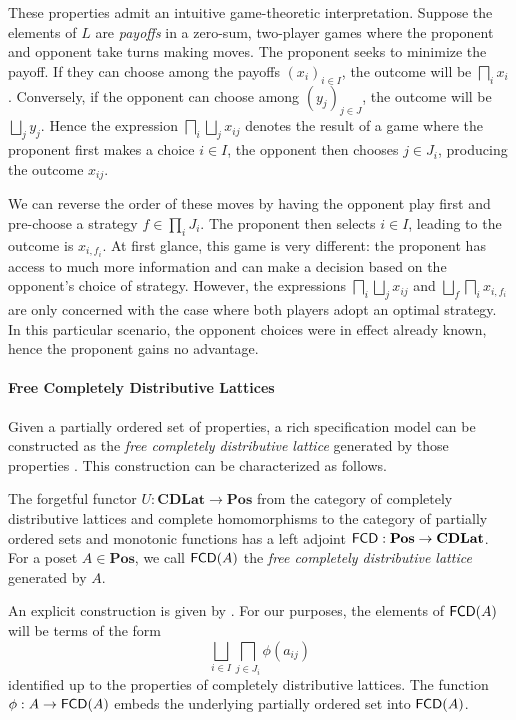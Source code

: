 \documentclass[acmsmall,review,anonymous]{acmart}\settopmatter{printfolios=true,printccs=false,printacmref=false}
\begin{document}
These properties admit an intuitive game-theoretic interpretation.
Suppose the elements of $L$
are \emph{payoffs} in a zero-sum, two-player games
where the proponent and opponent
take turns making moves.
The proponent seeks to minimize the payoff.
If they can choose among the payoffs $(x_i)_{i \in I}$,
the outcome will be $\bigsqcap_i x_i$.
Conversely,
if the opponent can choose among $(y_j)_{j \in J}$,
the outcome will be $\bigsqcup_j y_j$.
Hence the expression
$\bigsqcap_i \bigsqcup_j x_{ij}$
denotes the result of a game where
the proponent first makes a choice $i \in I$,
the opponent then chooses $j \in J_i$,
producing the outcome $x_{ij}$.

We can reverse the order of these moves
by having the opponent play first
and pre-choose a strategy $f \in \prod_i J_i$.
The proponent then selects $i \in I$,
leading to the outcome is $x_{i,f_i}$.
At first glance,
this game is very different:
the proponent has access to much more information
and can make a decision based on the opponent's choice of strategy.
However,
the expressions $\bigsqcap_i \bigsqcup_j x_{ij}$
and $\bigsqcup_f \bigsqcap_i x_{i,f_i}$
are only concerned with the case where both players adopt
an optimal strategy.
In this particular scenario,
the opponent choices were in effect already known,
hence the proponent gains no advantage.

\paragraph{Free Completely Distributive Lattices}

Given a partially ordered set of properties,
a rich specification model can be constructed as
the \emph{free completely distributive lattice}
generated by those properties \cite{augtyp,dndf}.
This construction can be characterized as follows.

\begin{definition}
The forgetful functor
$U : \mathbf{CDLat} \rightarrow \mathbf{Pos}$
from the category of completely distributive lattices
and complete homomorphisms
to the category of partially ordered sets
and monotonic functions
has a left adjoint
$ \mathsf{FCD}  : \mathbf{Pos} \rightarrow \mathbf{CDLat}$.
For a poset $A \in \mathbf{Pos}$,
we call $ \mathsf{FCD} (A)$ the \emph{free completely distributive lattice}
generated by $A$.
\end{definition}

An explicit construction is given by \citet{augtyp}.
For our purposes,
the elements of $ \mathsf{FCD} (A)$
will be terms of the form
\[
  \bigsqcup_{i \in I} \bigsqcap_{j \in J_i} \phi(a_{ij})
\]
identified up to the properties of completely distributive lattices.
The function $\phi : A \rightarrow  \mathsf{FCD} (A)$
embeds the underlying partially ordered set
into $ \mathsf{FCD} (A)$.
\end{document}
